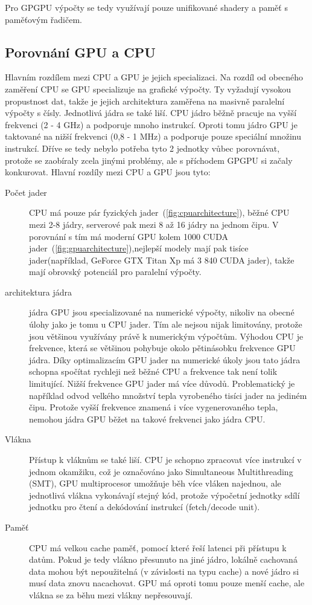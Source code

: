 Pro GPGPU výpočty se tedy využívají pouze unifikované shadery a paměť s paměťovým řadičem.

\subsection{Porovnání GPU a CPU} \label{ssec:gpucpucomparison}
Hlavním rozdílem mezi CPU a GPU je jejich specializaci. Na rozdíl od obecného zaměření CPU se GPU specializuje na grafické výpočty. Ty vyžadují vysokou propustnost dat, takže je jejich architektura zaměřena na masivně paralelní výpočty s čísly. Jednotlivá jádra se také liší. CPU jádro běžně pracuje na vyšší frekvenci (2 - 4 GHz) a podporuje mnoho instrukcí. Oproti tomu jádro GPU je taktované na nižší frekvenci (0,8 - 1 MHz) a podporuje pouze speciální množinu instrukcí. Dříve se tedy nebylo potřeba tyto 2 jednotky vůbec porovnávat, protože se zaobíraly zcela jinými problémy, ale s příchodem GPGPU si začaly konkurovat. Hlavní rozdíly mezi CPU a GPU jsou tyto:
\begin{description}
\item[Počet jader] CPU má pouze pár fyzických jader~(\autoref{fig:cpuarchitecture}), běžné CPU mezi 2-8 jádry, serverové pak mezi 8 až 16 jádry na jednom čipu. V porovnání s tím má moderní GPU kolem 1000 CUDA jader~(\autoref{fig:gpuarchitecture}),nejlepší modely mají pak tisíce jader(například, GeForce GTX Titan Xp má 3 840 CUDA jader), takže mají obrovský potenciál pro paralelní výpočty.
\item[architektura jádra] jádra GPU jsou specializované na numerické výpočty, nikoliv na obecné úlohy jako je tomu u CPU jader. Tím ale nejsou nijak limitovány, protože jsou většinou využívány právě k numerickým výpočtům. Výhodou CPU je frekvence, která se většinou pohybuje okolo pětinásobku frekvence GPU jádra. Díky optimalizacím GPU jader na numerické úkoly jsou tato jádra schopna spočítat rychleji než běžné CPU a frekvence tak není tolik limitující. Nižší frekvence GPU jader má více důvodů. Problematický je například odvod velkého množství tepla vyrobeného tisíci jader na jediném čipu. Protože vyšší frekvence znamená i více vygenerovaného tepla, nemohou jádra GPU běžet na takové frekvenci jako jádra CPU.
\item[Vlákna] Přístup k vláknům se také liší. CPU je schopno zpracovat více instrukcí v jednom okamžiku, což je označováno jako Simultaneous Multithreading (SMT), GPU multiprocesor umožňuje běh více vláken najednou, ale jednotlivá vlákna vykonávají stejný kód, protože výpočetní jednotky sdílí jednotku pro čtení a dekódování instrukcí (fetch/decode unit).
\item[Paměť] CPU má velkou cache paměť, pomocí které řeší latenci při přístupu k datům. Pokud je tedy vlákno přesunuto na jiné jádro, lokálně cachovaná data mohou být nepoužitelná (v závislosti na typu cache) a nové jádro si musí data znovu nacachovat. GPU má oproti tomu pouze menší cache, ale vlákna se za běhu mezi vlákny nepřesouvají.
\end{description}

